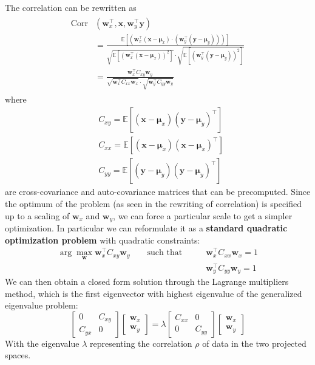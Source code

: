 The correlation can be rewritten as
\begin{align}
	\begin{split}
		\text{Corr}&(\mathbf{w}_x^\top, \mathbf{x}, \mathbf{w}_y^\top \mathbf{y}) \\
		& = \frac{\mathbb{E}[(\mathbf{w}_x^\top(\mathbf{x}-\mathbf{\mu}_x) \cdot  (\mathbf{w}_y^\top(\mathbf{y}-\mathbf{\mu}_y)))]}{\sqrt{\mathbb{E}[(\mathbf{w}_x^\top(\mathbf{x}-\mathbf{\mu}_x))^2]} \cdot \sqrt{\mathbb{E}[(\mathbf{w}_y^\top(\mathbf{y}-\mathbf{\mu}_y))^2]}} \\
		& = \frac{\mathbf{w}_x^\top C_{xy}\mathbf{w}_y}{\sqrt{\mathbf{w}^\top_x C_{xx}\mathbf{w}_x} \cdot \sqrt{\mathbf{w}^\top_y C_{yy}\mathbf{w}_y}} \label{eq:cca}
	\end{split}
\end{align}
where
\begin{align*}
	& C_{xy} = \mathbb{E}[(\mathbf{x}-\mathbf{\mu}_x)(\mathbf{y}-\mathbf{\mu}_y)^\top] \\
	& C_{xx} = \mathbb{E}[(\mathbf{x}-\mathbf{\mu}_x)(\mathbf{x}-\mathbf{\mu}_x)^\top] \\
	& C_{yy} = \mathbb{E}[(\mathbf{y}-\mathbf{\mu}_y)(\mathbf{y}-\mathbf{\mu}_y)^\top]
\end{align*}
are cross-covariance and auto-covariance matrices that can be precomputed. Since the optimum of the problem (as seen in the rewriting of correlation) is specified up to a scaling of $\mathbf{w}_x$ and $\mathbf{w}_y$, we can force a particular scale to get a simpler optimization. In particular we can reformulate it as a \textbf{standard quadratic optimization problem} with quadratic constraints:
\begin{align*}
	\arg \max_\mathbf{w} \mathbf{w}^\top_x C_{xy}\mathbf{w}_y \qquad \text{such that} \qquad & \mathbf{w}_x^\top C_{xx}\mathbf{w}_x = 1 \\
	& \mathbf{w}_y^\top C_{yy}\mathbf{w}_y = 1
\end{align*}
We can then obtain a closed form solution through the Lagrange multipliers method, which is the first eigenvector with highest eigenvalue of the generalized eigenvalue problem:
\begin{equation}
	\begin{bmatrix}
		0 & C_{xy} \\
		C_{yx} & 0
	\end{bmatrix} \begin{bmatrix}
	\mathbf{w}_x \\ \mathbf{w}_y
	\end{bmatrix} = \lambda \begin{bmatrix}
	C_{xx} & 0 \\
	0 & C_{yy} 
	\end{bmatrix} \begin{bmatrix}
	\mathbf{w}_x \\ \mathbf{w}_y
	\end{bmatrix}
\end{equation}
With the eigenvalue $\lambda$ representing the correlation $\rho$ of data in the two projected spaces.
\newpage
